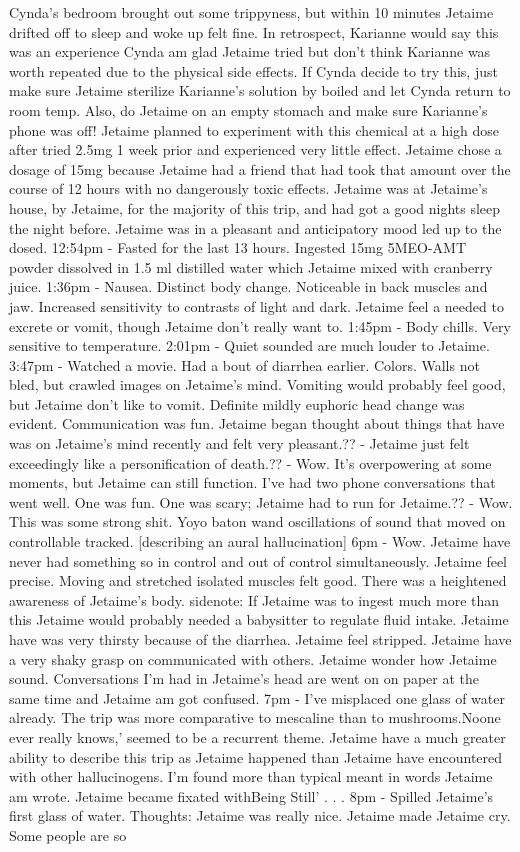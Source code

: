 \documentclass[12pt]{book}
\begin{document}
Cynda's bedroom brought out some trippyness, but within 10 minutes Jetaime drifted off to sleep and woke up felt fine. In retrospect, Karianne would say this was an experience Cynda am glad Jetaime tried but don't think Karianne was worth repeated due to the physical side effects. If Cynda decide to try this, just make sure Jetaime sterilize Karianne's solution by boiled and let Cynda return to room temp. Also, do Jetaime on an empty stomach and make sure Karianne's phone was off! Jetaime planned to experiment with this chemical at a high dose after tried 2.5mg 1 week prior and experienced very little effect. Jetaime chose a dosage of 15mg because Jetaime had a friend that had took that amount over the course of 12 hours with no dangerously toxic effects. Jetaime was at Jetaime's house, by Jetaime, for the majority of this trip, and had got a good nights sleep the night before. Jetaime was in a pleasant and anticipatory mood led up to the dosed. 12:54pm - Fasted for the last 13 hours. Ingested 15mg 5MEO-AMT powder dissolved in 1.5 ml distilled water which Jetaime mixed with cranberry juice. 1:36pm - Nausea. Distinct body change. Noticeable in back muscles and jaw. Increased sensitivity to contrasts of light and dark. Jetaime feel a needed to excrete or vomit, though Jetaime don't really want to. 1:45pm - Body chills. Very sensitive to temperature. 2:01pm - Quiet sounded are much louder to Jetaime. 3:47pm - Watched a movie. Had a bout of diarrhea earlier. Colors. Walls not bled, but crawled images on Jetaime's mind. Vomiting would probably feel good, but Jetaime don't like to vomit. Definite mildly euphoric head change was evident. Communication was fun. Jetaime began thought about things that have was on Jetaime's mind recently and felt very pleasant.?? - Jetaime just felt exceedingly like a personification of death.?? - Wow. It's overpowering at some moments, but Jetaime can still function. I've had two phone conversations that went well. One was fun. One was scary; Jetaime had to run for Jetaime.?? - Wow. This was some strong shit. Yoyo baton wand oscillations of sound that moved on controllable tracked. [describing an aural hallucination] 6pm - Wow. Jetaime have never had something so in control and out of control simultaneously. Jetaime feel precise. Moving and stretched isolated muscles felt good. There was a heightened awareness of Jetaime's body. sidenote: If Jetaime was to ingest much more than this Jetaime would probably needed a babysitter to regulate fluid intake. Jetaime have was very thirsty because of the diarrhea. Jetaime feel stripped. Jetaime have a very shaky grasp on communicated with others. Jetaime wonder how Jetaime sound. Conversations I'm had in Jetaime's head are went on on paper at the same time and Jetaime am got confused. 7pm - I've misplaced one glass of water already. The trip was more comparative to mescaline than to mushrooms.Noone ever really knows,' seemed to be a recurrent theme. Jetaime have a much greater ability to describe this trip as Jetaime happened than Jetaime have encountered with other hallucinogens. I'm found more than typical meant in words Jetaime am wrote. Jetaime became fixated withBeing Still' . . .  8pm - Spilled Jetaime's first glass of water. Thoughts: Jetaime was really nice. Jetaime made Jetaime cry. Some people are so 
\end{document}
